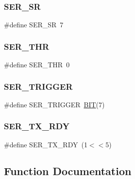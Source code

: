 \subsubsection{\texorpdfstring{S\+E\+R\+\_\+\+SR}{SER\_SR}}
{\footnotesize\ttfamily \#define S\+E\+R\+\_\+\+SR~7}

\hypertarget{group__ser__port_ga3702c28928f73b9841ab8269f64177ed}{}\label{group__ser__port_ga3702c28928f73b9841ab8269f64177ed} 
\subsubsection{\texorpdfstring{S\+E\+R\+\_\+\+T\+HR}{SER\_THR}}
{\footnotesize\ttfamily \#define S\+E\+R\+\_\+\+T\+HR~0}

\hypertarget{group__ser__port_ga4c5703803ba2f88b2c80a98503cd7b48}{}\label{group__ser__port_ga4c5703803ba2f88b2c80a98503cd7b48} 
\subsubsection{\texorpdfstring{S\+E\+R\+\_\+\+T\+R\+I\+G\+G\+ER}{SER\_TRIGGER}}
{\footnotesize\ttfamily \#define S\+E\+R\+\_\+\+T\+R\+I\+G\+G\+ER~\hyperlink{video__gr_8c_a3a8ea58898cb58fc96013383d39f482c}{B\+IT}(7)}

\hypertarget{group__ser__port_ga39627267c307802e2a030abe796fb97b}{}\label{group__ser__port_ga39627267c307802e2a030abe796fb97b} 
\subsubsection{\texorpdfstring{S\+E\+R\+\_\+\+T\+X\+\_\+\+R\+DY}{SER\_TX\_RDY}}
{\footnotesize\ttfamily \#define S\+E\+R\+\_\+\+T\+X\+\_\+\+R\+DY~(1$<$$<$5)}



\subsection{Function Documentation}
\hypertarget{group__ser__port_gad7f306574426f807f460ddcde260c11b}{}\label{group__ser__port_gad7f306574426f807f460ddcde260c11b} 
